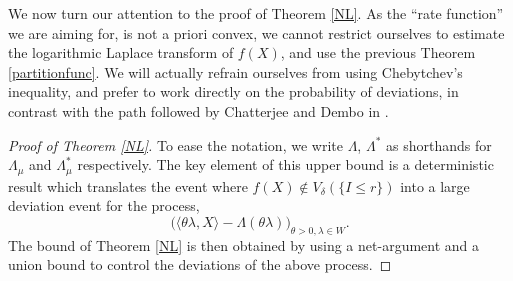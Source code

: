 \documentclass[aop,preprint]{imsart}
\numberwithin{equation}{section}
\theoremstyle{definition}
\theoremstyle{plain}
\theoremstyle{remark}
\begin{document}
We now turn our attention to the proof of Theorem \ref{NL}. As the ``rate function'' we are aiming for, is not a priori convex, we cannot restrict ourselves to estimate the logarithmic Laplace transform of $f(X)$, and use the previous Theorem \ref{partitionfunc}. We will actually refrain ourselves from using Chebytchev's inequality, and prefer to work directly on the probability of deviations, in contrast with the path followed by Chatterjee and Dembo in \cite[section 4, proof of Theorem 1.1]{CD}.
\begin{proof}[Proof of Theorem \ref{NL}]To ease the notation, we write $\Lambda$, $\Lambda^*$ as shorthands for $\Lambda_\mu$ and $\Lambda^*_\mu$ respectively. The key element of this upper bound is a deterministic result which translates the event where $f(X) \notin V_\delta (\{ I\leq r\})$ into a large deviation event for the process, 
$$ \big( \langle \theta \lambda, X\rangle -\Lambda(\theta \lambda)\big)_{\theta >0, \lambda \in W}.$$
The bound of Theorem \ref{NL} is then obtained by using a net-argument and a union bound to control the deviations of the above process.


\end{proof}
\end{document}
